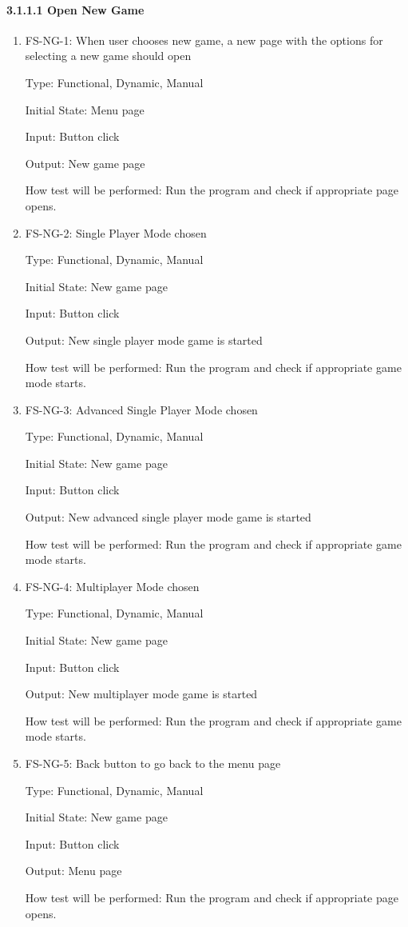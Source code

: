\documentclass[12pt,letterpaper]{article}
\begin{document}
	\paragraph{3.1.1.1 Open New Game}
	\begin{enumerate}
	\item FS-NG-1: When user chooses new game, a new page with the options for selecting a new game should open
	
	Type: Functional, Dynamic, Manual

	Initial State: Menu page

	Input: Button click

	Output: New game page

	How test will be performed: Run the program and check if appropriate page opens.

	\item FS-NG-2: Single Player Mode chosen

	Type: Functional, Dynamic, Manual

	Initial State: New game page

	Input: Button click

	Output: New single player mode game is started

	How test will be performed: Run the program and check if appropriate game mode starts.

	\item FS-NG-3: Advanced Single Player Mode chosen

	Type: Functional, Dynamic, Manual

	Initial State: New game page

	Input: Button click

	Output: New advanced single player mode game is started

	How test will be performed: Run the program and check if appropriate game mode starts.

	\item FS-NG-4: Multiplayer Mode chosen

	Type: Functional, Dynamic, Manual

	Initial State: New game page

	Input: Button click

	Output: New multiplayer mode game is started

	How test will be performed: Run the program and check if appropriate game mode starts.

	\item FS-NG-5: Back button to go back to the menu page

	Type: Functional, Dynamic, Manual

	Initial State: New game page

	Input: Button click

	Output: Menu page

	How test will be performed: Run the program and check if appropriate page opens.
	\end{enumerate}
\end{document}
